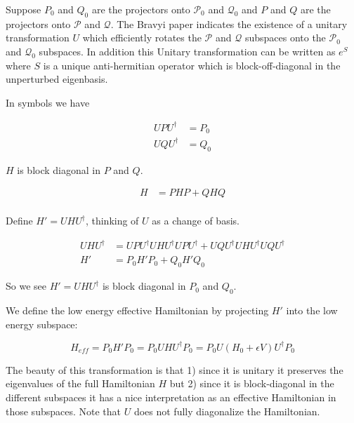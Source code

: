 \documentclass[12pt]{article}
\begin{document}
Suppose $P_0$ and $Q_0$ are the projectors onto $\mathcal{P}_0$ and $\mathcal{Q}_0$ and $P$ and $Q$ are the projectors onto $\mathcal{P}$ and $\mathcal{Q}$. The Bravyi paper indicates the existence of a unitary transformation $U$ which efficiently rotates the $\mathcal{P}$ and $\mathcal{Q}$ subspaces onto the $\mathcal{P}_0$ and $\mathcal{Q}_0$ subspaces. In addition this Unitary transformation can be written as $e^S$ where $S$ is a unique anti-hermitian operator which is block-off-diagonal in the unperturbed eigenbasis.

In symbols we have

\begin{equation}
\begin{split}
UPU^{\dag} &= P_0\\
UQU^{\dag} &= Q_0
\end{split}
\end{equation}

$H$ is block diagonal in $P$ and $Q$.

\begin{equation}
\begin{split}
H &= PHP + QHQ\\
\end{split}
\end{equation}

Define $H' = UHU^{\dag}$, thinking of $U$ as a change of basis.

\begin{equation}
\begin{aligned}
UHU^{\dag} &= UPU^{\dag}UHU^{\dag}UPU^{\dag} + UQU^{\dag}UHU^{\dag}UQU^{\dag}\\
H' &= P_0 H' P_0 + Q_0 H' Q_0
\end{aligned}
\end{equation}

So we see $H' = UHU^{\dag}$ is block diagonal in $P_0$ and $Q_0$.

We define the low energy effective Hamiltonian by projecting $H'$ into the low energy subspace:

\begin{equation}
H_{eff} = P_0H'P_0 = P_0 U H U^{\dag} P_0 = P_0 U(H_0+\epsilon V) U^{\dag} P_0
\end{equation}

The beauty of this transformation is that 1) since it is unitary it preserves the eigenvalues of the full Hamiltonian $H$ but 2) since it is block-diagonal in the different subspaces it has a nice interpretation as an effective Hamiltonian in those subspaces. Note that $U$ does not fully diagonalize the Hamiltonian.
\end{document}
